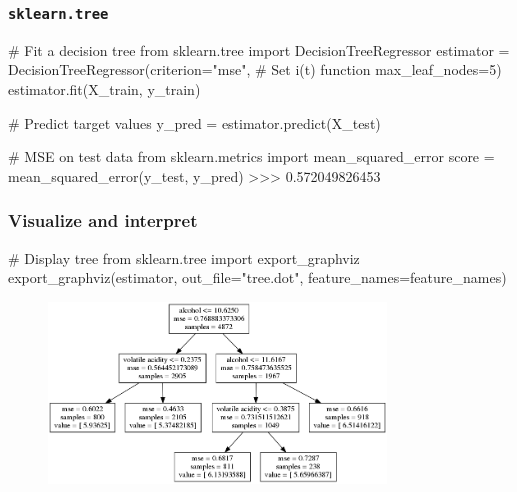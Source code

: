 \documentclass{beamer}
\begin{document}
\begin{frame}[fragile]
    \frametitle{\texttt{sklearn.tree}}

{\scriptsize
\begin{pythoncode}
# Fit a decision tree
from sklearn.tree import DecisionTreeRegressor
estimator = DecisionTreeRegressor(criterion="mse",   # Set i(t) function
                                  max_leaf_nodes=5)
estimator.fit(X_train, y_train)

# Predict target values
y_pred = estimator.predict(X_test)

# MSE on test data
from sklearn.metrics import mean_squared_error
score = mean_squared_error(y_test, y_pred)
>>> 0.572049826453
\end{pythoncode}
}

\end{frame}

\begin{frame}[fragile]
\frametitle{Visualize and interpret}

{\footnotesize
\begin{pythoncode}
# Display tree
from sklearn.tree import export_graphviz
export_graphviz(estimator, out_file="tree.dot",
                feature_names=feature_names)
\end{pythoncode}
}

\begin{figure}
\includegraphics[width=0.8\textwidth]{./figures/wine-tree.png}
\end{figure}

\end{frame}
\end{document}
